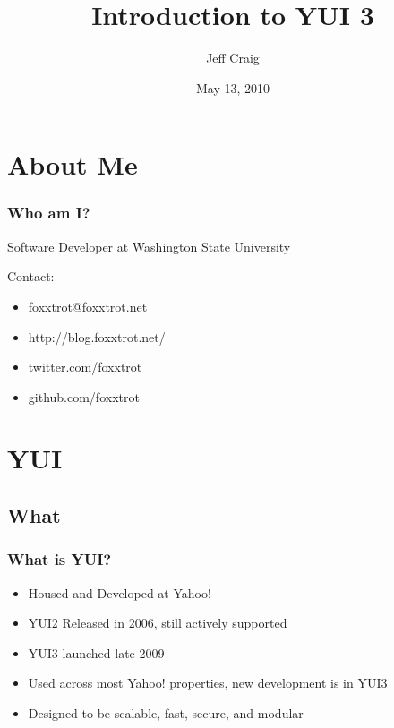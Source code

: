 \documentclass[t]{beamer}
\title{Introduction to YUI 3}
\author{Jeff Craig}
\date{May 13, 2010}
\begin{document}
\maketitle

\section{About Me}
\begin{frame}
 \frametitle{Who am I?}
 Software Developer at Washington State University

 \bigskip
 Contact:
 \begin{itemize}
  \item foxxtrot@foxxtrot.net
  \item http://blog.foxxtrot.net/
  \item twitter.com/foxxtrot
  \item github.com/foxxtrot
 \end{itemize}
\end{frame}

\section{YUI}
\subsection{What}
\begin{frame}
 \frametitle{What is YUI?}
 \begin{itemize}
  \item Housed and Developed at Yahoo!
  \item YUI2 Released in 2006, still actively supported
  \item YUI3 launched late 2009
  \item Used across most Yahoo! properties, new development is in YUI3
  \item Designed to be scalable, fast, secure, and modular
 \end{itemize}
\end{frame}
\end{document}
